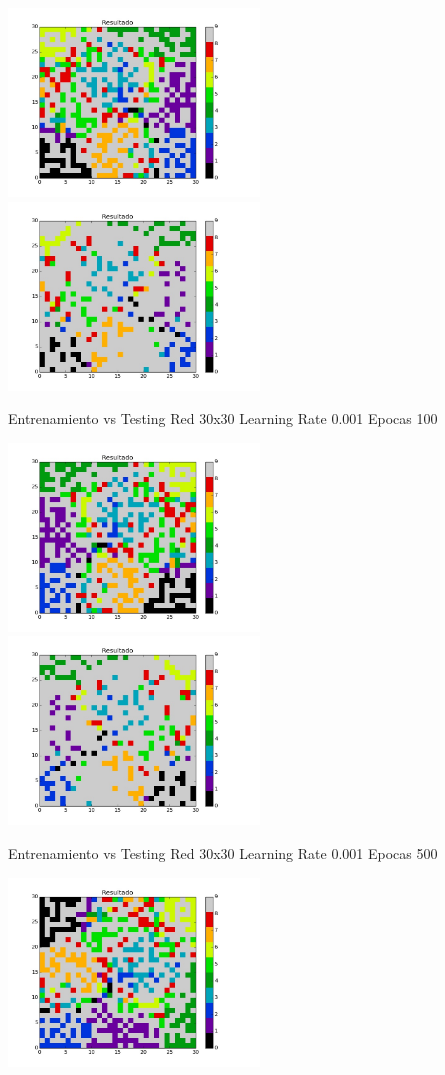 \includegraphics[width=0.5\textwidth]{img/ej2_train_M_30_lrate_001_epocas_500}
\includegraphics[width=0.5\textwidth]{img/ej2_test_M_30_lrate_001_epocas_500}
{\footnotesize Entrenamiento vs Testing Red 30x30 Learning Rate 0.001 Epocas 100\par}
\includegraphics[width=0.5\textwidth]{img/ej2_train_M_30_lrate_001_epocas_1000}
\includegraphics[width=0.5\textwidth]{img/ej2_test_M_30_lrate_001_epocas_1000}
{\footnotesize Entrenamiento vs Testing Red 30x30 Learning Rate 0.001 Epocas 500\par}
\includegraphics[width=0.5\textwidth]{img/ej2_train_M_30_lrate_001_epocas_1500}
